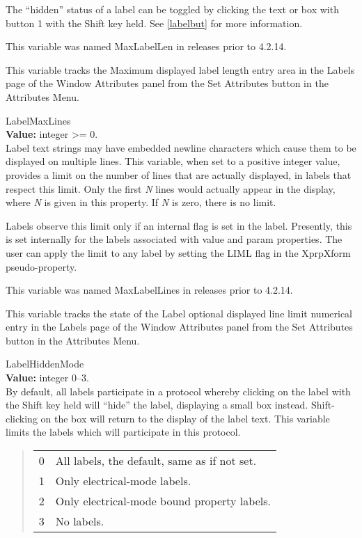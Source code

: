 \begin{description}
The ``hidden'' status of a label can be toggled by clicking the text
or box with button 1 with the {\kb Shift} key held.  See
\ref{labelbut} for more information.

This variable was named {\et MaxLabelLen} in releases prior to
4.2.14.

This variable tracks the {\cb Maximum displayed label length} entry
area in the {\cb Labels} page of the {\cb Window Attributes} panel
from the {\cb Set Attributes} button in the {\cb Attributes Menu}.

\item{\et LabelMaxLines}\\
{\bf Value:} integer {\vt >=} 0.\\
Label text strings may have embedded newline characters which cause
them to be displayed on multiple lines.  This variable, when set to a
positive integer value, provides a limit on the number of lines that
are actually displayed, in labels that respect this limit.  Only the
first {\it N} lines would actually appear in the display, where {\it
N} is given in this property.  If {\it N} is zero, there is no limit.

Labels observe this limit only if an internal flag is set in the
label.  Presently, this is set internally for the labels associated
with {\et value} and {\et param} properties.  The user can apply the
limit to any label by setting the {\vt LIML} flag in the {\et
XprpXform} pseudo-property.

This variable was named {\et MaxLabelLines} in releases prior to
4.2.14.

This variable tracks the state of the {\cb Label optional displayed
line limit} numerical entry in the {\cb Labels} page of the {\cb
Window Attributes} panel from the {\cb Set Attributes} button in the
{\cb Attributes Menu}.

\item{\et LabelHiddenMode}\\
{\bf Value:} integer 0--3.\\
By default, all labels participate in a protocol whereby clicking on
the label with the {\kb Shift} key held will ``hide'' the label,
displaying a small box instead.  {\kb Shift}-clicking on the box
will return to the display of the label text.  This variable limits
the labels which will participate in this protocol. 

\begin{quote}
\begin{tabular}{ll}\\
0 & All labels, the default, same as if not set.\\
1 & Only electrical-mode labels.\\
2 & Only electrical-mode bound property labels.\\
3 & No labels.\\
\end{tabular}
\end{quote}


\end{description}

